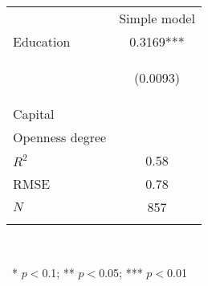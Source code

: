 \begin{center}
\begin{tabular}{lc}
\hline \noalign{\smallskip} & Simple model\\
\noalign{\smallskip}\hline \noalign{\smallskip}Education & 0.3169***\\
 & \begin{footnotesize}(0.0093)\end{footnotesize}\\
\noalign{\smallskip}Capital & \\
\noalign{\smallskip}Openness degree & \\
\noalign{\smallskip}$R^2$ & 0.58\\
RMSE & 0.78\\
$N$ & 857\\
\noalign{\smallskip}\hline\end{tabular}\\
\smallskip\begin{footnotesize}\ * $p<0$.1; ** $p<0$.05; *** $p<0$.01\end{footnotesize}\\
\smallskip
\end{center}
